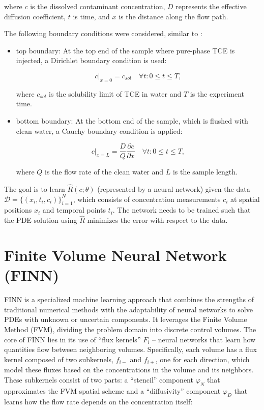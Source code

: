 where $c$ is the dissolved contaminant concentration, $D$ represents the effective diffusion coefficient, $t$ is time, and $x$ is the distance along the flow path.

The following boundary conditions were considered, similar to \textcite{nowak2016entropy}:

\begin{itemize}
    \item top boundary: At the top end of the sample where pure-phase TCE is injected, a Dirichlet boundary condition is used:

    \begin{equation}
        c|_{x=0} = c_{sol} \quad \forall t : 0 \leq t \leq T,
    \end{equation}

    where $c_{sol}$ is the solubility limit of TCE in water and $T$ is the experiment time.

    \item bottom boundary: At the bottom end of the sample, which is flushed with clean water, a Cauchy boundary condition is applied:

    \begin{equation}
        c|_{x=L} = \frac{D}{Q} \frac{\partial c}{\partial x} \quad \forall t : 0 \leq t \leq T,
    \end{equation}

    where $Q$ is the flow rate of the clean water and $L$ is the sample length.
\end{itemize}

The goal is to learn $\hat{R}(c;\theta)$ (represented by a neural network) given the data $\mathcal{D} = \{ (x_i, t_i, c_i) \}_{i=1}^N$, which consists of concentration measurements $c_i$ at spatial positions $x_i$ and temporal points $t_i$. The network needs to be trained such that the PDE solution using $\hat{R}$ minimizes the error with respect to the data.




\section{Finite Volume Neural Network (FINN)}

FINN \cite{finn} is a specialized machine learning approach that combines the strengths of traditional numerical methods with the adaptability of neural networks to solve PDEs with unknown or uncertain components. It leverages the Finite Volume Method (FVM), dividing the problem domain into discrete control volumes. The core of FINN lies in its use of ``flux kernels'' $F_i$ – neural networks that learn how quantities flow between neighboring volumes. Specifically, each volume has a flux kernel composed of two subkernels, $f_{i-}$ and $f_{i+}$, one for each direction, which model these fluxes based on the concentrations in the volume and its neighbors. These subkernels consist of two parts: a ``stencil'' component $\varphi_N$ that approximates the FVM spatial scheme and a ``diffusivity'' component $\varphi_D$ that learns how the flow rate depends on the concentration itself:

